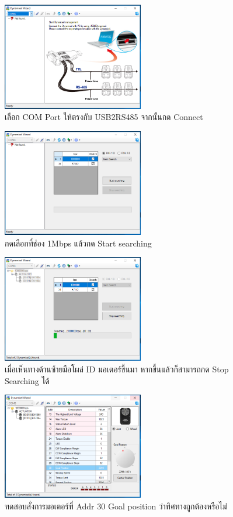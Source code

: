 \begin{figure}[!ht]
    \centering
    \includegraphics[width=0.55\textwidth]{chapter3/images/roboplus/roboplus3.PNG}
    \caption*{เลือก COM Port ให้ตรงกับ USB2RS485 จากนั้นกด Connect}
\end{figure}
\begin{figure}[!ht]
    \centering
    \includegraphics[width=0.55\textwidth]{chapter3/images/roboplus/roboplus4.PNG}
    \caption*{กดเลือกที่ช่อง 1Mbps แล้วกด Start searching}
\end{figure}
\begin{figure}[!ht]
    \centering
    \includegraphics[width=0.55\textwidth]{chapter3/images/roboplus/roboplus5.PNG}
    \caption*{เมื่อเห็นทางด้านซ้ายมือโผล่ ID มอเตอร์ขึ้นมา หากขึ้นแล้วก็สามารถกด Stop Searching ได้}
\end{figure}
\begin{figure}[!ht]
    \centering
    \includegraphics[width=0.55\textwidth]{chapter3/images/roboplus/roboplus6.PNG}
    \caption*{ทดสอบสั่งการมอเตอร์ที่ Addr 30 Goal position ว่าทิศทางถูกต้องหรือไม่}
\end{figure}
